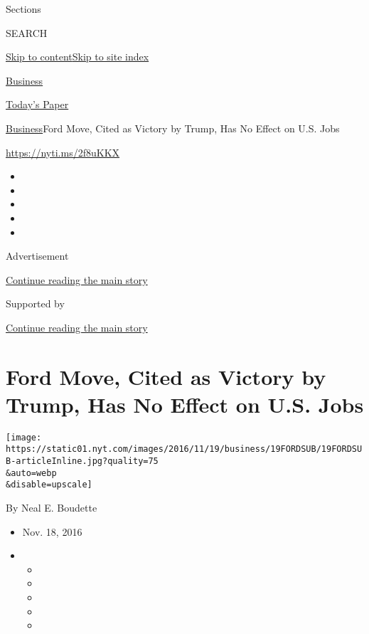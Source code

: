 Sections

SEARCH

\protect\hyperlink{site-content}{Skip to
content}\protect\hyperlink{site-index}{Skip to site index}

\href{https://www.nytimes.com/section/business}{Business}

\href{https://myaccount.nytimes.com/auth/login?response_type=cookie\&client_id=vi}{}

\href{https://www.nytimes.com/section/todayspaper}{Today's Paper}

\href{/section/business}{Business}\textbar{}Ford Move, Cited as Victory
by Trump, Has No Effect on U.S. Jobs

\url{https://nyti.ms/2f8uKKX}

\begin{itemize}
\item
\item
\item
\item
\item
\end{itemize}

Advertisement

\protect\hyperlink{after-top}{Continue reading the main story}

Supported by

\protect\hyperlink{after-sponsor}{Continue reading the main story}

\hypertarget{ford-move-cited-as-victory-by-trump-has-no-effect-on-us-jobs}{%
\section{Ford Move, Cited as Victory by Trump, Has No Effect on U.S.
Jobs}\label{ford-move-cited-as-victory-by-trump-has-no-effect-on-us-jobs}}

\texttt{[image: https://static01.nyt.com/images/2016/11/19/business/19FORDSUB/19FORDSUB-articleInline.jpg?quality=75\\\&auto=webp\\\&disable=upscale]}

By Neal E. Boudette

\begin{itemize}
\item
  Nov. 18, 2016
\item
  \begin{itemize}
  \item
  \item
  \item
  \item
  \item
  \end{itemize}
\end{itemize}

